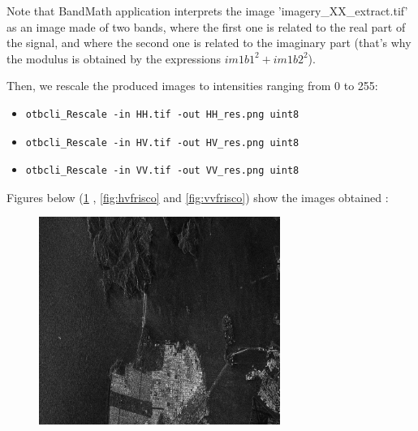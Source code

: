 Note that BandMath application interprets the image 'imagery\_XX\_extract.tif'
as an image made of two bands, where the first one is related to the real part
of the signal, and where the second one is related to the imaginary part (that's
why the modulus is obtained by the expressions $im1b1^2+im1b2^2$).

Then, we rescale the produced images to intensities ranging from 0 to 255:

\begin{itemize}
\item 
\begin{verbatim} 
otbcli_Rescale -in HH.tif -out HH_res.png uint8 
\end{verbatim}
									  
\item 
\begin{verbatim} 
otbcli_Rescale -in HV.tif -out HV_res.png uint8 
\end{verbatim}
									  
\item 
\begin{verbatim} 
otbcli_Rescale -in VV.tif -out VV_res.png uint8 
\end{verbatim}
\end{itemize}

Figures below (\ref{fig:hhfrisco} , \ref{fig:hvfrisco} and \ref{fig:vvfrisco}) show the images obtained :
\begin{figure}[!h]
\center
\includegraphics[width=0.7\textwidth]{../Art/SARImages/RSAT2_HH_Frisco.png}
\label{fig:hhfrisco}
\end{figure}

